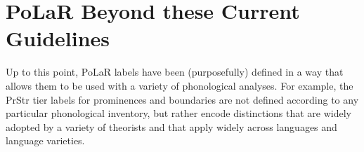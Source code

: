 \documentclass[11pt, twoside]{memoir}
\def\textlabel#1{{\relsize{-.5}\fontspec[Mapping=tex-text]{Roboto Mono}{#1}}}
\begin{document}
%
%
%
%
%





\chapter{PoLaR Beyond these Current Guidelines}\label{ch:beyond}
Up to this point, PoLaR labels have been (purposefully) defined in a way that allows them to be used with a variety of phonological analyses. For example, the PrStr tier labels for prominences and boundaries  are not defined according to any particular phonological inventory, but rather encode distinctions that are widely adopted by a variety of theorists and that apply widely across languages and language varieties.
\end{document}
